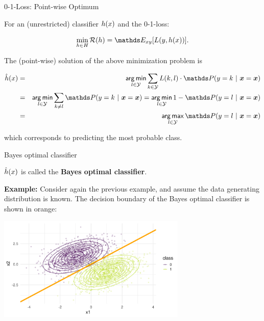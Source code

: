 \begin{vbframe}{0-1-Loss: Point-wise Optimum}

For an (unrestricted) classifier $h(x)$ and the 0-1-loss: 

$$
\min_{h \in \Hspace} \risk(h) = \E_{xy}[L(y, \hx)]. 
$$

The (point-wise) solution of the above minimization problem is

\begin{footnotesize}
  \begin{eqnarray*}  
  \hxh &=& \argmin_{l \in \Yspace} \sum_{k \in \Yspace} L(k, l) \cdot \P(y = k~|~\xv = \xv) \\
  &=& \argmin_{l \in \Yspace} \sum_{k \ne l} \P(y = k~|~\xv = \xv) = \argmin_{l \in \Yspace} 1 - \P(y = l~|~\xv = \xv) \\
  &=& \argmax_{l \in \Yspace} \P(y = l~|~ \xv = \xv)
  \end{eqnarray*}
\end{footnotesize}

which corresponds to predicting the most probable class. 

\end{vbframe}


\begin{vbframe}{Bayes optimal classifier}

$\hat{h}(x)$ is called the \textbf{Bayes optimal classifier}. 

\lz

\textbf{Example: } Consider again the previous example, and assume the data generating distribution is known. The decision boundary of the Bayes optimal classifier is shown in orange: 

\begin{center}
\includegraphics[width = 9cm ]{figure_man/bayes_error_3.png} \\
\end{center}


\end{vbframe}


